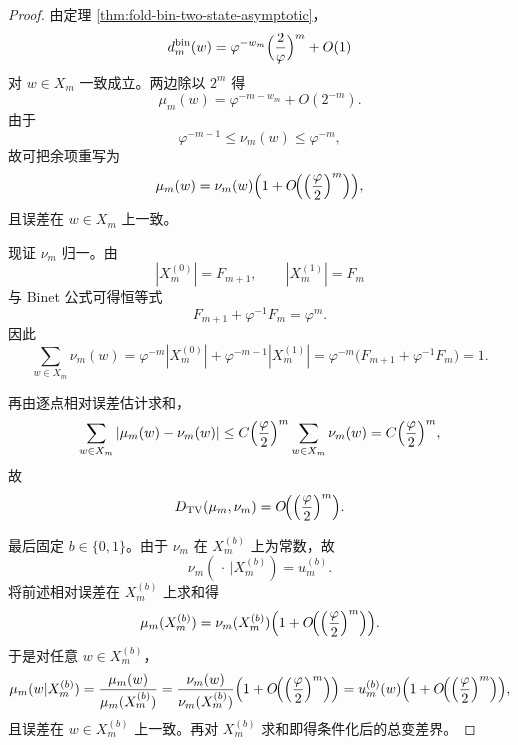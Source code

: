 \begin{proof}
由定理 \ref{thm:fold-bin-two-state-asymptotic}，
\[
d_m^{\mathrm{bin}}(w)=\varphi^{-w_m}\Bigl(\frac{2}{\varphi}\Bigr)^m+O(1)
\]
对 \(w\in X_m\) 一致成立。两边除以 \(2^m\) 得
\[
\mu_m(w)=\varphi^{-m-w_m}+O(2^{-m}).
\]
由于
\[
\varphi^{-m-1}\le \nu_m(w)\le \varphi^{-m},
\]
故可把余项重写为
\[
\mu_m(w)=\nu_m(w)\Bigl(1+O\!\Bigl(\Bigl(\frac{\varphi}{2}\Bigr)^m\Bigr)\Bigr),
\]
且误差在 \(w\in X_m\) 上一致。

现证 \(\nu_m\) 归一。由
\[
|X_m^{(0)}|=F_{m+1},
\qquad
|X_m^{(1)}|=F_m
\]
与 Binet 公式可得恒等式
\[
F_{m+1}+\varphi^{-1}F_m=\varphi^m.
\]
因此
\[
\sum_{w\in X_m}\nu_m(w)
=\varphi^{-m}|X_m^{(0)}|+\varphi^{-m-1}|X_m^{(1)}|
=\varphi^{-m}\bigl(F_{m+1}+\varphi^{-1}F_m\bigr)=1.
\]

再由逐点相对误差估计求和，
\[
\sum_{w\in X_m}|\mu_m(w)-\nu_m(w)|
\le
C\Bigl(\frac{\varphi}{2}\Bigr)^m\sum_{w\in X_m}\nu_m(w)
=
C\Bigl(\frac{\varphi}{2}\Bigr)^m,
\]
故
\[
D_{\mathrm{TV}}(\mu_m,\nu_m)
=O\!\Bigl(\Bigl(\frac{\varphi}{2}\Bigr)^m\Bigr).
\]

最后固定 \(b\in\{0,1\}\)。由于 \(\nu_m\) 在 \(X_m^{(b)}\) 上为常数，故
\[
\nu_m(\,\cdot\,|X_m^{(b)})=u_m^{(b)}.
\]
将前述相对误差在 \(X_m^{(b)}\) 上求和得
\[
\mu_m(X_m^{(b)})=\nu_m(X_m^{(b)})\Bigl(1+O\!\Bigl(\Bigl(\frac{\varphi}{2}\Bigr)^m\Bigr)\Bigr).
\]
于是对任意 \(w\in X_m^{(b)}\)，
\[
\mu_m(w|X_m^{(b)})
=\frac{\mu_m(w)}{\mu_m(X_m^{(b)})}
=\frac{\nu_m(w)}{\nu_m(X_m^{(b)})}
\Bigl(1+O\!\Bigl(\Bigl(\frac{\varphi}{2}\Bigr)^m\Bigr)\Bigr)
=u_m^{(b)}(w)\Bigl(1+O\!\Bigl(\Bigl(\frac{\varphi}{2}\Bigr)^m\Bigr)\Bigr),
\]
且误差在 \(w\in X_m^{(b)}\) 上一致。再对 \(X_m^{(b)}\) 求和即得条件化后的总变差界。
\end{proof}

